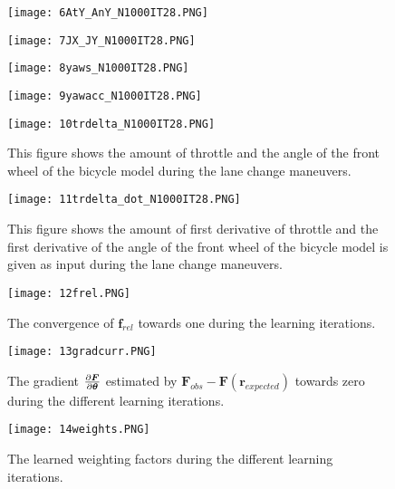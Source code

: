 \begin{figure}[h!]
	\centering
	\texttt{[image: 6AtY\_AnY\_N1000IT28.PNG]}
\end{figure}

\begin{figure}[h!]
	\centering
	\texttt{[image: 7JX\_JY\_N1000IT28.PNG]}
\end{figure}

\begin{figure}[h!]
	\centering
	\texttt{[image: 8yaws\_N1000IT28.PNG]}
\end{figure}

\begin{figure}[h!]
	\centering
	\texttt{[image: 9yawacc\_N1000IT28.PNG]}
\end{figure}

\begin{figure}[h!]
	\centering
	\texttt{[image: 10trdelta\_N1000IT28.PNG]}
	\caption{This figure shows the amount of throttle and the angle of the front wheel of the bicycle model during the lane change maneuvers.}
	\label{fig:app_deltaE}
\end{figure}

\begin{figure}[h!]
	\centering
	\texttt{[image: 11trdelta\_dot\_N1000IT28.PNG]}
	\caption{This figure shows the amount of first derivative of throttle and the first derivative of the angle of the front wheel of the bicycle model is given as input during the lane change maneuvers.}
	\label{fig:app_delta_dotE}
\end{figure}

\begin{figure}[h!]
	\centering
	\texttt{[image: 12frel.PNG]}
	\caption{The convergence of $\bm{f}_{rel}$ towards one during the learning iterations.}
	\label{fig:app_convE}
\end{figure}

\begin{figure}[h!]
	\centering
	\texttt{[image: 13gradcurr.PNG]}
	\caption{The gradient $\pdv{\bm{F}}{\bm{\theta}}$ estimated by $\bm{F}_{obs} - \bm{F}(\bm{r}_{expected})$ towards zero during the different learning iterations. }
	\label{fig:app_gradE}
\end{figure}

\begin{figure}[h!]
	\centering
	\texttt{[image: 14weights.PNG]}
	\caption{The learned weighting factors during the different learning iterations.}
	\label{fig:app_weightsE}
\end{figure}

